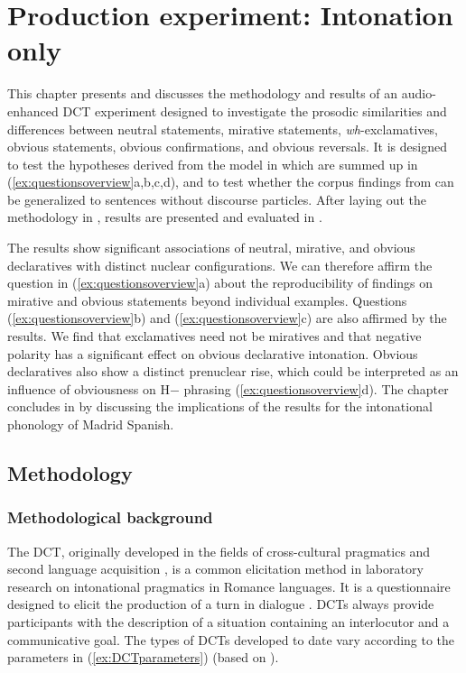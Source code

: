\chapter{Production experiment: Intonation only}\label{ch:6}

This chapter presents and discusses the methodology and results of an audio-enhanced \ac{DCT} experiment designed to investigate the prosodic similarities and differences between neutral statements, mirative statements, \textit{wh}-exclamatives, obvious statements, obvious confirmations, and obvious reversals. It is designed to test the hypotheses derived from the model in  which are summed up in (\ref{ex:questionsoverview}a,b,c,d), and to test whether the corpus findings from  can be generalized to sentences without discourse particles. After laying out the methodology in , results are presented and evaluated in . 

The results show significant associations of neutral, mirative, and obvious declaratives with distinct nuclear configurations. We can therefore affirm the question in (\ref{ex:questionsoverview}a) about the reproducibility of findings on mirative and obvious statements beyond individual examples. Questions (\ref{ex:questionsoverview}b) and (\ref{ex:questionsoverview}c) are also affirmed by the results. We find that exclamatives need not be miratives and that negative polarity has a significant effect on obvious declarative intonation. Obvious declaratives also show a distinct prenuclear rise, which could be interpreted as an influence of obviousness on H$-$ phrasing (\ref{ex:questionsoverview}d). The chapter concludes in  by discussing the implications of the results for the intonational phonology of Madrid Spanish.

\section{Methodology}\label{ch:6.1}

\subsection{Methodological background}\label{ch:6.1.1}

The \ac{DCT}, originally developed in the fields of cross-cultural pragmatics and second language acquisition \citep{BlumKulka1989,Billmyer2000,FelixBrasdefer.2010}, is a common elicitation method in laboratory research on intonational pragmatics in Romance languages. It is a questionnaire designed to elicit the production of a turn in dialogue \citep{KasperDahl.1991}. \ac{DCT}s always provide participants with the description of a situation containing an interlocutor and a communicative goal. The types of \acp{DCT} developed to date vary according to the parameters in (\ref{ex:DCTparameters}) (based on \cite[195--196]{VanrellFeldhausenAstruc.2018}).

